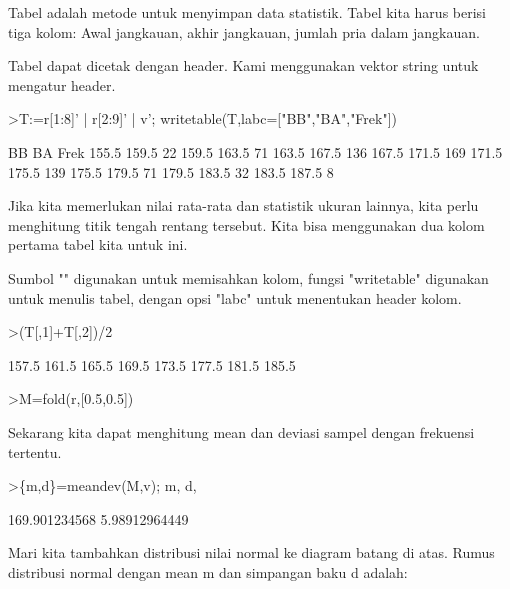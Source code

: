 \documentclass[a4paper,10pt]{article}
\begin{document}
\begin{eulernotebook}
\begin{eulercomment}
\begin{eulercomment}
\begin{eulercomment}
Tabel adalah metode untuk menyimpan data statistik. Tabel kita harus
berisi tiga kolom: Awal jangkauan, akhir jangkauan, jumlah pria dalam
jangkauan.

Tabel dapat dicetak dengan header. Kami menggunakan vektor string
untuk mengatur header.
\end{eulercomment}
\begin{eulerprompt}
>T:=r[1:8]' | r[2:9]' | v'; writetable(T,labc=["BB","BA","Frek"])
\end{eulerprompt}
\begin{euleroutput}
          BB        BA      Frek
       155.5     159.5        22
       159.5     163.5        71
       163.5     167.5       136
       167.5     171.5       169
       171.5     175.5       139
       175.5     179.5        71
       179.5     183.5        32
       183.5     187.5         8
\end{euleroutput}
\begin{eulercomment}
Jika kita memerlukan nilai rata-rata dan statistik ukuran lainnya,
kita perlu menghitung titik tengah rentang tersebut. Kita bisa
menggunakan dua kolom pertama tabel kita untuk ini.

Sumbol "\textbar{}" digunakan untuk memisahkan kolom, fungsi "writetable"
digunakan untuk menulis tabel, dengan opsi "labc" untuk menentukan
header kolom.
\end{eulercomment}
\begin{eulerprompt}
>(T[,1]+T[,2])/2 
\end{eulerprompt}
\begin{euleroutput}
          157.5 
          161.5 
          165.5 
          169.5 
          173.5 
          177.5 
          181.5 
          185.5 
\end{euleroutput}
\begin{eulerprompt}
>M=fold(r,[0.5,0.5])
\end{eulerprompt}
\begin{euleroutput}
  [157.5,  161.5,  165.5,  169.5,  173.5,  177.5,  181.5,  185.5]
\end{euleroutput}
\begin{eulercomment}
Sekarang kita dapat menghitung mean dan deviasi sampel dengan
frekuensi tertentu.
\end{eulercomment}
\begin{eulerprompt}
>\{m,d\}=meandev(M,v); m, d,
\end{eulerprompt}
\begin{euleroutput}
  169.901234568
  5.98912964449
\end{euleroutput}
\begin{eulercomment}
Mari kita tambahkan distribusi nilai normal ke diagram batang di atas.
Rumus distribusi normal dengan mean m dan simpangan baku d adalah:


\end{eulercomment}
\end{eulercomment}
\end{eulercomment}
\end{eulernotebook}
\end{document}

